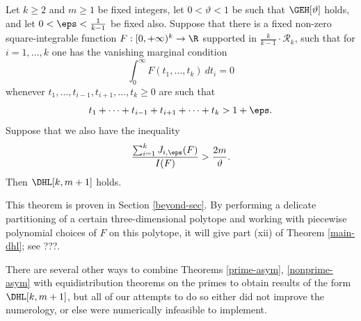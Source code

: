 \begin{theorem}\label{epsilon-beyond}  Let $k \geq 2$ and $m \geq 1$ be fixed integers, let $0 <\vartheta < 1$ be such that $\GEH[\vartheta]$ holds, and let $0 < \eps < \frac{1}{k-1}$ be fixed also. Suppose that there is a fixed non-zero square-integrable function $F: [0,+\infty)^k \to \R$ supported in $\frac{k}{k-1} \cdot {\mathcal R}_k$, such that for $i=1,\dots,k$ one has the vanishing marginal condition
\begin{equation}\label{vanishing-marginal}
\int_0^\infty F(t_1,\dots,t_k)\ dt_i = 0
\end{equation}
 whenever $t_1,\dots,t_{i-1},t_{i+1},\dots,t_k \geq 0$ are such that
$$ t_1+\dots+t_{i-1}+t_{i+1}+\dots+t_k > 1+\eps.$$
Suppose that we also have the inequality
$$ \frac{\sum_{i=1}^k J_{i,\eps}(F)}{I(F)} > \frac{2m}{\vartheta}.$$
Then $\DHL[k,m+1]$ holds.
\end{theorem}

This theorem is proven in Section \ref{beyond-sec}.  By performing a delicate partitioning of a certain three-dimensional polytope and working with piecewise polynomial choices of $F$ on this polytope, it will give part (xii) of Theorem \ref{main-dhl}; see ???.

There are several other ways to combine Theorems \ref{prime-asym}, \ref{nonprime-asym} with equidistribution theorems on the primes to obtain results of the form $\DHL[k,m+1]$, but all of our attempts to do so either did not improve the numerology, or else were numerically infeasible to implement.